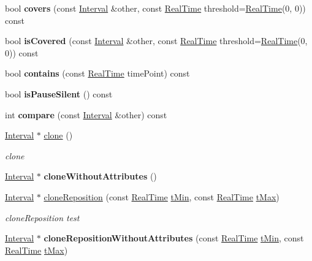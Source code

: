 \begin{DoxyCompactItemize}
\mbox{\label{class_interval_a5f7771aff890c149e17a3d42e64cf28f}} 
bool {\bfseries covers} (const \hyperlink{class_interval}{Interval} \&other, const \hyperlink{struct_real_time}{Real\+Time} threshold=\hyperlink{struct_real_time}{Real\+Time}(0, 0)) const
\item 
\mbox{\label{class_interval_ab964b1cb7f889b01324e09469c52f8cc}} 
bool {\bfseries is\+Covered} (const \hyperlink{class_interval}{Interval} \&other, const \hyperlink{struct_real_time}{Real\+Time} threshold=\hyperlink{struct_real_time}{Real\+Time}(0, 0)) const
\item 
\mbox{\label{class_interval_a39f8e2edd008936f87cb9918bc4028bc}} 
bool {\bfseries contains} (const \hyperlink{struct_real_time}{Real\+Time} time\+Point) const
\item 
\mbox{\label{class_interval_a8c30cc5304863265519a1bf8888e0b40}} 
bool {\bfseries is\+Pause\+Silent} () const
\item 
\mbox{\label{class_interval_a41d11f2d133b984b9f24cedc359f5763}} 
int {\bfseries compare} (const \hyperlink{class_interval}{Interval} \&other) const
\item 
\hyperlink{class_interval}{Interval} $\ast$ \hyperlink{class_interval_a19000e776f0533de156ce3ab9a6313dc}{clone} ()
\begin{DoxyCompactList}\small\item\em clone \end{DoxyCompactList}\item 
\mbox{\label{class_interval_a295b9712732a7b209a0c32d5e4d1795b}} 
\hyperlink{class_interval}{Interval} $\ast$ {\bfseries clone\+Without\+Attributes} ()
\item 
\hyperlink{class_interval}{Interval} $\ast$ \hyperlink{class_interval_afa26f985839fcb819f9fec30fc22afb8}{clone\+Reposition} (const \hyperlink{struct_real_time}{Real\+Time} \hyperlink{class_interval_aba4daaa96ab1085b72cf19c896401593}{t\+Min}, const \hyperlink{struct_real_time}{Real\+Time} \hyperlink{class_interval_ab9efa1b25d5e4997d99ad0f360c7b2d7}{t\+Max})
\begin{DoxyCompactList}\small\item\em clone\+Reposition test \end{DoxyCompactList}\item 
\mbox{\label{class_interval_a4635bc58c9f393f4ff0288b7a777f6e9}} 
\hyperlink{class_interval}{Interval} $\ast$ {\bfseries clone\+Reposition\+Without\+Attributes} (const \hyperlink{struct_real_time}{Real\+Time} \hyperlink{class_interval_aba4daaa96ab1085b72cf19c896401593}{t\+Min}, const \hyperlink{struct_real_time}{Real\+Time} \hyperlink{class_interval_ab9efa1b25d5e4997d99ad0f360c7b2d7}{t\+Max})
\end{DoxyCompactItemize}
